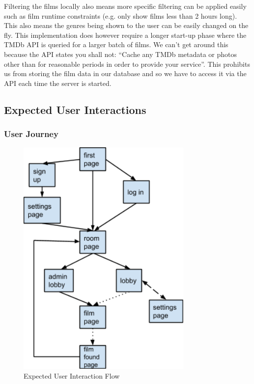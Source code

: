 \documentclass{article}
\begin{document}
Filtering the films locally also means more specific filtering can be applied easily such as film runtime constraints (e.g. only show films less than 2 hours long). This also means the genres being shown to the user can be easily changed on the fly. This implementation does however require a longer start-up phase where the TMDb API is queried for a larger batch of films. We can’t get around this because the API states you shall not: “Cache any TMDb metadata or photos other than for reasonable periods in order to provide your service”. This prohibits us from storing the film data in our database and so we have to access it via the API each time the server is started.
\subsection{Expected User Interactions}
\subsubsection{User Journey}
\begin{figure}[H]
\centering
\caption{Expected User Interaction Flow}
\label{sec:sysarchitecture}
\includegraphics[scale=0.6]{userinteraction}
\end{figure}
\end{document}
